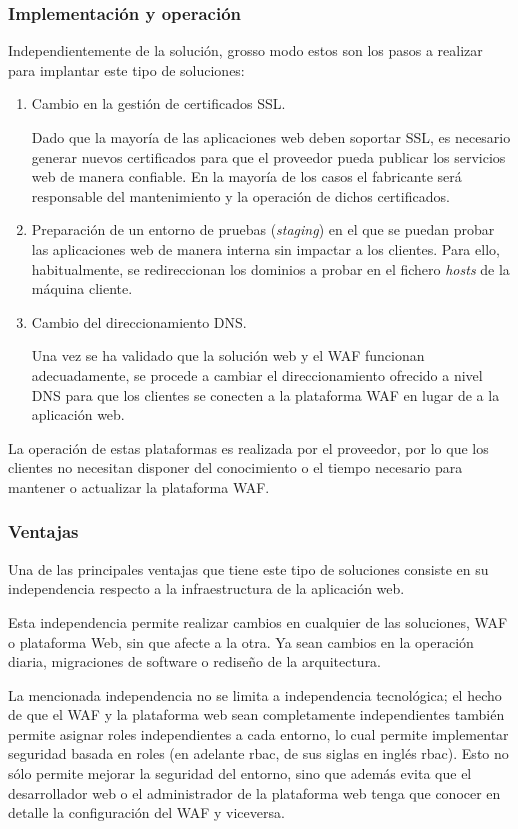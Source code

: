 \subsubsection{Implementación y operación}
\par Independientemente de la solución, grosso modo estos son los pasos a realizar para implantar este tipo de soluciones:
\begin{enumerate}
  \item Cambio en la gestión de certificados SSL.
    \par Dado que la mayoría de las aplicaciones web deben soportar SSL, es necesario generar nuevos certificados para que el proveedor pueda
    publicar los servicios web de manera confiable. En la mayoría de los casos el fabricante será responsable del mantenimiento y la operación
    de dichos certificados.
  \item Preparación de un entorno de pruebas ({\em staging}) en el que se puedan probar las aplicaciones web de manera interna sin impactar
    a los clientes. Para ello, habitualmente, se redireccionan los dominios a probar en el fichero {\em hosts} de la máquina cliente.
  \item Cambio del direccionamiento DNS.
    \par Una vez se ha validado que la solución web y el WAF funcionan adecuadamente, se procede a cambiar el direccionamiento ofrecido a nivel
    DNS para que los clientes se conecten a la plataforma WAF en lugar de a la aplicación web.
\end{enumerate}

\par La operación de estas plataformas es realizada por el proveedor, por lo que los clientes no necesitan disponer del conocimiento o el
tiempo necesario para mantener o actualizar la plataforma WAF.

\subsubsection{Ventajas}
\par Una de las principales ventajas que tiene este tipo de soluciones consiste en su independencia respecto a la infraestructura de la
aplicación web.
\par Esta independencia permite realizar cambios en cualquier de las soluciones, WAF o plataforma Web, sin que afecte a la otra. Ya sean
cambios en la operación diaria, migraciones de software o rediseño de la arquitectura.
\par La mencionada independencia no se limita a independencia tecnológica; el hecho de que el WAF y la plataforma web sean completamente
independientes también permite asignar roles independientes a cada entorno, lo cual permite implementar seguridad basada en roles (en adelante
\acrshort{rbac}, de sus siglas en inglés \acrlong{rbac}). Esto no sólo permite mejorar la seguridad del entorno, sino que además evita
que el desarrollador web o el administrador de la plataforma web tenga que conocer en detalle la configuración del WAF y viceversa.

